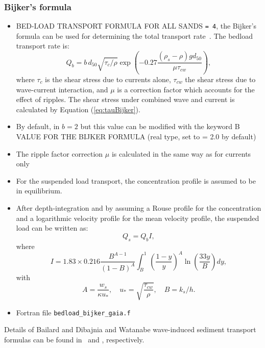 \subsubsection{Bijker's formula}
\begin{itemize}
\item {\ttfamily BED-LOAD TRANSPORT FORMULA FOR ALL SANDS} \texttt{= 4}, the Bijker's formula can be used for determining the total transport rate~\cite{Bijker}. The bedload transport rate is:
\begin{equation*}
Q_b = b\,d_{50}\sqrt{\tau_c/\rho}\exp\left(-0.27\frac{(\rho_s-\rho)gd_{50}}{\mu \tau_{cw}}\right),
\end{equation*}
where $\tau_c$ is the shear stress due to currents alone, $\tau_{cw}$ the shear stress due to wave-current
interaction, and $\mu$ is a correction factor which accounts for the effect of ripples. The shear stress under combined wave and current is calculated
by Equation (\ref{eq:tauBijker}).
\item By default, in \gaia{} $b=2$ but this value can be modified with the keyword {\ttfamily B VALUE FOR THE BIJKER FORMULA} (real type, set to {\ttfamily = 2.0} by default)

\item The ripple factor correction $\mu$ is calculated in the same way as for currents only
  \item For the suspended load transport, the
concentration profile is assumed to be in equilibrium.

\item After depth-integration and by assuming a Rouse profile for the concentration
and a logarithmic velocity profile for the mean velocity profile, the
suspended load can be written as:
\begin{equation*}
Q_{s} = Q_{b} I,
\end{equation*}
where
\begin{equation*}
I=1.83\times 0.216\frac{B^{A-1}}{(1-B)^A} \int_B^1
\left(\frac{1-y}{y}\right)^A \ln\left(\frac{33y}{B}\right) d y,
\end{equation*}
with
\begin{equation*}
A = \frac{w_s}{\kappa u_*},\quad u_*=\sqrt{\frac{\tau_{cw}}{\rho}},\quad B = k_s/h.
\end{equation*}
\item Fortran file \texttt{bedload\_bijker\_gaia.f}
\end{itemize}

Details of Bailard and Dibajnia and Watanabe wave-induced sediment transport formulas can be found in~\cite{Bailard} and \cite{Dibajnia}, respectively.


